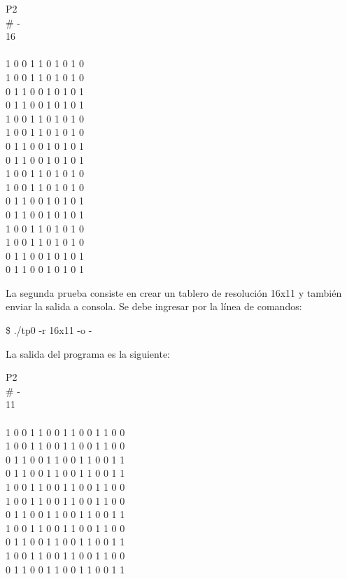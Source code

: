 \documentclass{article}
\begin{document}
{\ttfamily\footnotesize
	\indent P2 \\
	\indent \# - \\
	 16 \\
	 \\
	 1 0 0 1 1 0 1 0 1 0 \\
	 1 0 0 1 1 0 1 0 1 0 \\
	 0 1 1 0 0 1 0 1 0 1 \\ 
	 0 1 1 0 0 1 0 1 0 1 \\ 
	 1 0 0 1 1 0 1 0 1 0 \\ 
	 1 0 0 1 1 0 1 0 1 0 \\ 
	 0 1 1 0 0 1 0 1 0 1 \\ 
	 0 1 1 0 0 1 0 1 0 1 \\ 
	 1 0 0 1 1 0 1 0 1 0 \\ 
	 1 0 0 1 1 0 1 0 1 0 \\ 
	 0 1 1 0 0 1 0 1 0 1 \\ 
	 0 1 1 0 0 1 0 1 0 1 \\ 
	 1 0 0 1 1 0 1 0 1 0 \\ 
	 1 0 0 1 1 0 1 0 1 0 \\ 
	 0 1 1 0 0 1 0 1 0 1 \\ 
	 0 1 1 0 0 1 0 1 0 1 \\ 
}
\bigskip


	La segunda prueba consiste en crear un tablero de resolución 16x11 y también enviar la salida a consola. Se debe ingresar por la línea de comandos:
	\bigskip

{\ttfamily\footnotesize
\indent \$ ./tp0 -r 16x11 -o -\\}
\smallskip

	La salida del programa es la siguiente:
	\bigskip

{\ttfamily\footnotesize
	\indent P2 \\
	\indent \# - \\
	 11 \\
	 \\
	 1 0 0 1 1 0 0 1 1 0 0 1 1 0 0 \\
	 1 0 0 1 1 0 0 1 1 0 0 1 1 0 0 \\
	 0 1 1 0 0 1 1 0 0 1 1 0 0 1 1 \\
	 0 1 1 0 0 1 1 0 0 1 1 0 0 1 1 \\
	 1 0 0 1 1 0 0 1 1 0 0 1 1 0 0 \\
	 1 0 0 1 1 0 0 1 1 0 0 1 1 0 0 \\
	 0 1 1 0 0 1 1 0 0 1 1 0 0 1 1 \\
	 1 0 0 1 1 0 0 1 1 0 0 1 1 0 0 \\
	 0 1 1 0 0 1 1 0 0 1 1 0 0 1 1 \\
	 1 0 0 1 1 0 0 1 1 0 0 1 1 0 0 \\
	 0 1 1 0 0 1 1 0 0 1 1 0 0 1 1 \\
}
\bigskip
\end{document}
